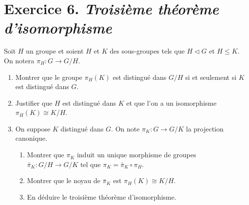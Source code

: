 \documentclass[./main]{subfiles}
\begin{document}
  \section{Exercice 6. \textit{Troisième théorème d'isomorphisme}}
  \begin{enonce}
    Soit $H$ un groupe et soient $H$ et $K$ des sous-groupes tels que $H \triangleleft G$ et $H \le K$.
    On notera $\pi_H : G \to G/H$.

    \begin{enumerate}
      \item Montrer que le groupe $\pi_H(K)$ est distingué dans $G / H$ si et seulement si $K$ est distingué dans $G$.
      \item Justifier que $H$ est distingué dans $K$ et que l'on a un isomorphisme $\pi_H(K) \cong K / H$. \label{td2-ex6-q2}
      \item On suppose $K$ distingué dans $G$. On note $\pi_K : G \to G / K$ la projection canonique.
        \begin{enumerate}
          \item Montrer que $\pi_K$ induit un unique morphisme de groupes~$\bar{\pi}_K : G/H \to G/K$ tel que $\pi_K = \bar{\pi}_K \circ \pi_H$.
          \item Montrer que le noyau de $\bar{\pi}_K$ est $\pi_H(K)\cong K / H$.
          \item En déduire le troisième théorème d'isomorphisme.
        \end{enumerate}
    \end{enumerate}
  \end{enonce}
\end{document}
